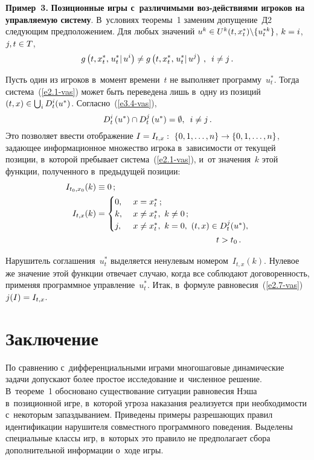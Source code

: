 \begin{multicols}{2}
    \textbf{Пример~3.} \textbf{Позиционные игры с~различимыми воз-\linebreak действиями 
игроков на управляемую систему}. В~условиях теоремы~1 заменим 
допущение~Д2 сле\-ду\-ющим предположением. Для любых значений \linebreak
$u^k\hm\in 
U^k(t,x_t^*)\backslash \{u_t^{*k}\}$, $k\hm=i$, $j,t\hm\in T$,
     \begin{equation}
     g\left(t,x_t^*,\left.u_t^*\right\vert u^i\right) \not= g\left(t,x_t^*, \left.u_t^*\right\vert 
u^j\right)\,,\enskip i\not= j\,.
     \label{e3.4-vas}
     \end{equation}
     
    
    Пусть один из игроков в~момент времени~$t$ не выполняет 
программу~$u_t^*$. Тогда система~(\ref{e2.1-vas}) может быть переведена лишь 
в~одну из позиций $(t,x)\hm\in \bigcup\nolimits_i D_t^i (u^*)$.  
Согласно~(\ref{e3.4-vas}),
$$
D_t^i\left(u^*\right)\cap D_t^j\left(u^*\right)=\emptyset,\enskip i\not= j\,.
$$
Это 
позволяет ввести отображение $I\hm= I_{t,x}:\ \{ 0,1,\ldots ,n\}\hm\to \{ 0,1,\ldots, 
n\}$, задающее информационное множество игрока в~зависимости от текущей 
позиции, в~которой пребывает система~(\ref{e2.1-vas}), и~от значения~$k$ этой 
функции, полученного в~предыдущей позиции: 
    \begin{align*}
    I_{t_0,x_0}(k)& \equiv 0\,;\\
    I_{t,x}(k)&=\begin{cases}
    0, &\ x=x_t^*\,;\\
    k, &\ x\not=x_t^*,\ k\not=0\,;\\
    j, &\ x\not=x_t^*,\ k=0,\ (t,x)\in D_t^j(u^*),
        \end{cases}\\
&\hspace*{50mm}t>t_0\,.
    \end{align*}
    
    Нарушитель соглашения~$u_t^*$ выделяется ненулевым номером~$I_{t,x}(k)$. 
Нулевое же значение этой функции отвечает случаю, когда все соблюдают 
договоренность, применяя программное управление~$u_t^*$. Итак, в~формуле 
равновесия~(\ref{e2.7-vas}) $j(I)\hm= I_{t,x}$.

\section{Заключение }

    По сравнению с~дифференциальными играми многошаговые динамические 
задачи допускают более простое исследование и~численное решение. В~теореме~1 
обосновано существование ситуации равновесия Нэша в~позиционной игре, 
в~которой угроза наказания реализуется при необходимости с~некоторым 
запаздыванием. Приведены примеры разрешающих правил идентификации 
нарушителя совместного программного поведения. Выделены специальные классы 
игр, в~которых это правило не предполагает сбора дополнительной информации 
о~ходе игры.



\end{multicols}

